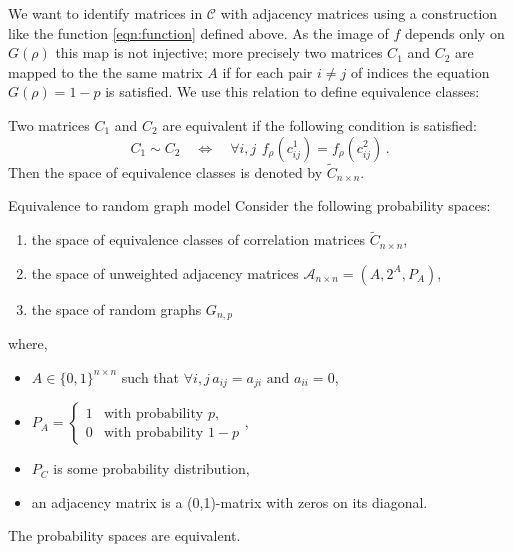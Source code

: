 We want to identify matrices in $\mathcal{C}$ with adjacency matrices using a construction like the function \ref{eqn:function} defined above.
As the image of $f$ depends only on $G(\rho)$  this map is not injective; more precisely two matrices $C_1$ and $C_2$ are mapped to the the same matrix $A$ if for each pair $i\neq j$ of indices the equation  $G(\rho) = 1-p$ is satisfied.
We use this relation to define equivalence classes:

\begin{definition}
\label{def:equiv_correlation}
Two matrices $C_1$ and $C_2$ are equivalent if the following condition is satisfied:
\begin{equation}C_1\sim C_2\quad \Leftrightarrow \quad \forall i,j \,\ f_{\rho}(c^1_{ij}) = f_{\rho}(c^2_{ij})\,.\end{equation}
Then the space of equivalence classes is denoted by $\widetilde{C}_{n\times n}$. 
\end{definition}



\begin{theorem}{Equivalence to random graph model}
Consider the following probability spaces:
\begin{enumerate}
	\item the space of equivalence classes of correlation matrices $\widetilde{C}_{n\times n}$,
	\item the space of unweighted adjacency matrices $\mathcal{A}_{n\times n} = \left( A, 2^A, P_A \right)$,
	\item the space of random graphs $G_{n,p}$
\end{enumerate}
\noindent where,
\begin{itemize}
	\item[] $A \in \{0,1\}^{n \times n}$ such that $\forall i,j\,  a_{ij} = a_{ji} \text{ and } a_{ii} = 0$,
	\item[] $P_A = \begin{cases} 1 & \text{with probability } p,\\0 & \text{with probability } 1-p\end{cases}$,
	\item[] $P_C$ is some probability distribution,
	\item[] an adjacency matrix is a (0,1)-matrix with zeros on its diagonal.
\end{itemize}
The probability spaces are equivalent.
\end{theorem}

